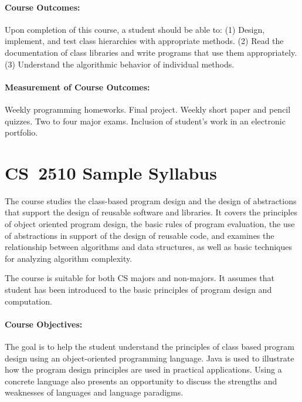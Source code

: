 \documentclass[11pt]{article}
\begin{document}
\paragraph{Course Outcomes:}
%
Upon completion of this course, a student should be able to: 
(1) Design, implement, and test class hierarchies with appropriate methods. 
(2) Read the documentation of class libraries and write programs that use them appropriately. 
(3) Understand the algorithmic behavior of individual methods.

\paragraph{Measurement of Course Outcomes:}
%
Weekly programming homeworks. Final project. Weekly short paper and pencil quizzes. Two to four major exams. Inclusion of student's work in an electronic portfolio.

\section{CS~2510 Sample Syllabus}

The course studies the class-based program design and the design of abstractions that support the design of reusable software and libraries. It covers the principles of object oriented program design, the basic rules of program evaluation, the use of abstractions in support of the design of reusable code, and examines the relationship between algorithms and data structures, as well as basic techniques for analyzing algorithm complexity.

The course is suitable for both CS majors and non-majors. It assumes that student has been introduced to the basic principles of program design and computation.

\paragraph{Course Objectives:}
%
The goal is to help the student understand the principles of class
based program design using an object-oriented programming
language. Java is used to illustrate how the program design principles
are used in practical applications. Using a concrete language also
presents an opportunity to discuss the strengths and weaknesses of
languages and language paradigms.
\end{document}
